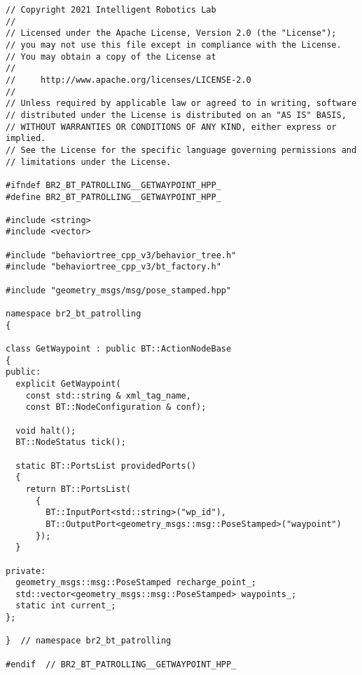  \footnotesize
\begin{tcolorbox}[sharp corners, colframe=gray!80, colback=LightGray, left=0pt, top=0pt, bottom=0pt, title=\texttt{br2\_bt\_patrolling/include/br2\_bt\_patrolling/GetWaypoint.hpp}]
  \begin{verbatim}
// Copyright 2021 Intelligent Robotics Lab
//
// Licensed under the Apache License, Version 2.0 (the "License");
// you may not use this file except in compliance with the License.
// You may obtain a copy of the License at
//
//     http://www.apache.org/licenses/LICENSE-2.0
//
// Unless required by applicable law or agreed to in writing, software
// distributed under the License is distributed on an "AS IS" BASIS,
// WITHOUT WARRANTIES OR CONDITIONS OF ANY KIND, either express or implied.
// See the License for the specific language governing permissions and
// limitations under the License.

#ifndef BR2_BT_PATROLLING__GETWAYPOINT_HPP_
#define BR2_BT_PATROLLING__GETWAYPOINT_HPP_

#include <string>
#include <vector>

#include "behaviortree_cpp_v3/behavior_tree.h"
#include "behaviortree_cpp_v3/bt_factory.h"

#include "geometry_msgs/msg/pose_stamped.hpp"

namespace br2_bt_patrolling
{

class GetWaypoint : public BT::ActionNodeBase
{
public:
  explicit GetWaypoint(
    const std::string & xml_tag_name,
    const BT::NodeConfiguration & conf);

  void halt();
  BT::NodeStatus tick();

  static BT::PortsList providedPorts()
  {
    return BT::PortsList(
      {
        BT::InputPort<std::string>("wp_id"),
        BT::OutputPort<geometry_msgs::msg::PoseStamped>("waypoint")
      });
  }

private:
  geometry_msgs::msg::PoseStamped recharge_point_;
  std::vector<geometry_msgs::msg::PoseStamped> waypoints_;
  static int current_;
};

}  // namespace br2_bt_patrolling

#endif  // BR2_BT_PATROLLING__GETWAYPOINT_HPP_
    \end{verbatim}
    \end{tcolorbox}
  \normalsize

